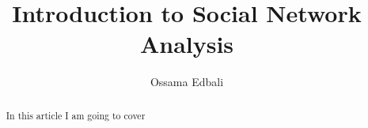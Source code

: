 \documentclass[a4paper, 11pt]{article}
\author{Ossama Edbali}
\title{Introduction to Social Network Analysis}
\begin{document}
    \maketitle

    \begin{abstract}
        In this article I am going to cover
    \end{abstract}
\end{document}
